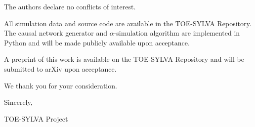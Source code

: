 \documentclass[11pt,a4paper]{article}
\theoremstyle{plain}
\theoremstyle{definition}
\begin{document}
\textbf{\1} The authors declare no conflicts of interest.

\textbf{\1} All simulation data and source code are available in the TOE-SYLVA Repository. The causal network generator and $\alpha$-simulation algorithm are implemented in Python and will be made publicly available upon acceptance.

\textbf{\1} A preprint of this work is available on the TOE-SYLVA Repository and will be submitted to arXiv upon acceptance.

We thank you for your consideration.

Sincerely,

\textbf{\1}
TOE-SYLVA Project

\textemdash{}

\textit{\1}
\textit{\1}



\end{document}

